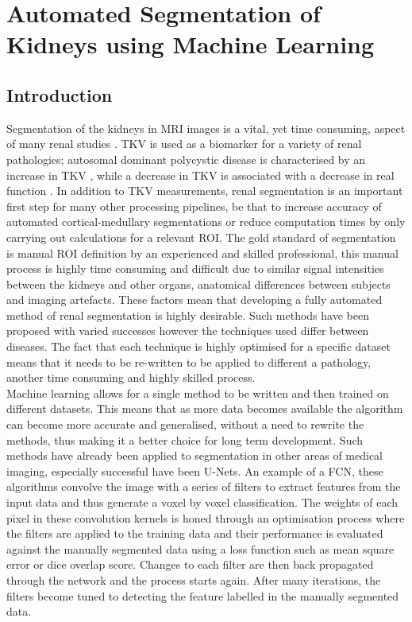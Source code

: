 \chapter{Automated Segmentation of Kidneys using Machine Learning}
\label{chap:ML}

\section{Introduction}

Segmentation of the kidneys in \ac{MRI} images is a vital, yet time consuming, aspect of many renal studies \cite{cohen_mri_2009, van_den_dool_functional_2005, cox_multiparametric_2017}. \ac{TKV} is used as a biomarker for a variety of renal pathologies; autosomal dominant polycystic disease is characterised by an increase in \ac{TKV} \cite{chapman_kidney_2012, tangri_total_2017}, while a decrease in \ac{TKV} is associated with a decrease in real function \cite{gong_relationship_2012}. In addition to \ac{TKV} measurements, renal segmentation is an important first step for many other processing pipelines, be that to increase accuracy of automated cortical-medullary segmentations or reduce computation times by only carrying out calculations for a relevant \ac{ROI}. The gold standard of segmentation is manual \ac{ROI} definition by an experienced and skilled professional, this manual process is highly time consuming and difficult due to similar signal intensities between the kidneys and other organs, anatomical differences between subjects and imaging artefacts. These factors mean that developing a fully automated method of renal segmentation is highly desirable. Such methods have been proposed with varied successes \cite{zollner_assessment_2012, seuss_development_2017} however the techniques used differ between diseases. The fact that each technique is highly optimised for a specific dataset means that it needs to be re-written to be applied to different a pathology, another time consuming and highly skilled process.\\

Machine learning allows for a single method to be written and then trained on different datasets. This means that as more data becomes available the algorithm can become more accurate and generalised, without a need to rewrite the methods, thus making it a better choice for long term development. Such methods have already been applied to segmentation in other areas of medical imaging, especially successful have been U-Nets. An example of a \ac{FCN}, these algorithms convolve the image with a series of filters to extract features from the input data and thus generate a voxel by voxel classification. The weights of each pixel in these convolution kernels is honed through an optimisation process where the filters are applied to the training data and their performance is evaluated against the manually segmented data using a loss function such as mean square error or dice overlap score. Changes to each filter are then back propagated through the network and the process starts again. After many iterations, the filters become tuned to detecting the feature labelled in the manually segmented data.\\ 

